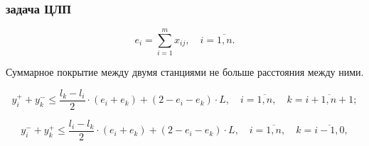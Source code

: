 \begin{frame}
    \frametitle{задача ЦЛП}
    \begin{minipage}[t]{0.5\linewidth}
        \begin{equation}
            \label{eq:part3_ei}
            e_i =  \sum\limits_{i=1}^m x_{ij}, \quad i = \overline{1,n}. 
          \end{equation}
    \end{minipage}

    \begin{minipage}[t]{0.5\linewidth}
        
    \bigskip
    \bigskip
    \bigskip
    Суммарное покрытие между двумя станциями не больше расстояния между ними.
          

    \end{minipage}
    \hfill
    \begin{minipage}[t]{0.47\linewidth}
        
    \end{minipage}

    \bigskip
    \fontsize{8pt}{7.2}\selectfont
    \begin{equation}
        \label{eq:part3_yi_3}
        y_i^+ + y_k^- \leq \frac{l_k - l_i}{2} \cdot (e_i + e_k ) + (2 - e_i - e_k ) \cdot L, \quad i = \overline{1,n},  \quad k = \overline{i+1,n+1};
      \end{equation}
      
      \begin{equation}
        \label{eq:part3_yi_4}
        y_i^- + y_k^+  \leq \frac{l_i-l_k}{2} \cdot (e_i + e_k) + (2 - e_i - e_k) \cdot L, \quad i = \overline{1,n}, \quad k = \overline{i-1,0},
      \end{equation}

\end{frame}

